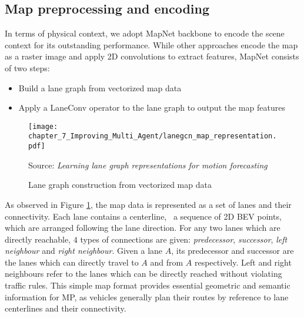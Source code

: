 \subsection{Map preprocessing and encoding}
\label{subsec:7_improving_efficiency_map_preprocessing_and_encoding}

In terms of physical context, we adopt MapNet \cite{liang2020learning} backbone to encode the scene context for its outstanding performance. %
While other approaches encode the map as a raster image and apply 2D convolutions to extract features, MapNet consists of two steps:

\begin{itemize}
	\item Build a lane graph from vectorized map data
	\item Apply a LaneConv operator to the lane graph to output the map features
\end{itemize}

\begin{figure}[h] 
	\centering
	\texttt{[image: chapter\_7\_Improving\_Multi\_Agent/lanegcn\_map\_representation.pdf]}
	\caption{Lane graph construction from vectorized map data}
	Source: \textit{Learning lane graph representations for motion forecasting} \cite{liang2020learning}
	\label{fig:chapter_7_Improving_Multi_Agent/improving_efficiency_lanegcn_map_representation}
\end{figure}

As observed in Figure \ref{fig:chapter_7_Improving_Multi_Agent/improving_efficiency_lanegcn_map_representation}, the map data is represented as a set of lanes and their connectivity. Each lane contains a centerline, \ie \ a sequence of 2D BEV points, which are arranged following the lane direction. For any two lanes which are directly reachable, $4$ types of connections are given: \textit{predecessor}, \textit{successor}, \textit{left neighbour} and \textit{right neighbour}. Given a lane $A$, its predecessor and successor are the lanes which can directly travel to $A$ and from $A$ respectively. Left and right neighbours refer to the  lanes which can be directly reached without violating traffic rules. This simple map format provides essential geometric and semantic information for \ac{MP}, as vehicles generally plan their routes by reference to lane centerlines and their connectivity. 

